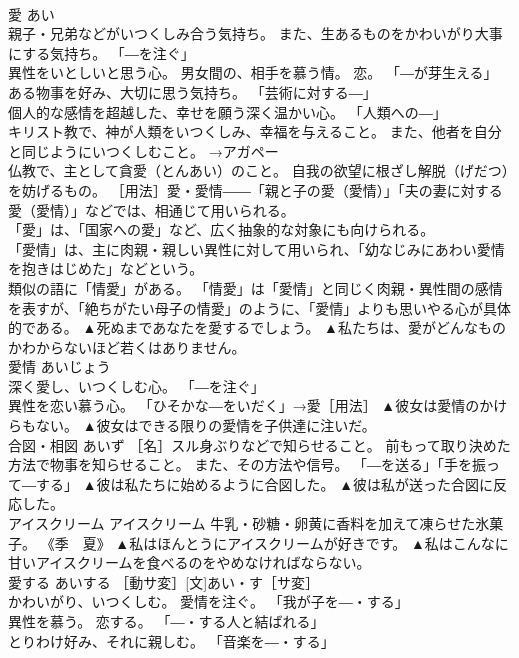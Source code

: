 \documentclass[8pt]{extreport}
\begin{document}
\begin{CJK}{UTF8}{min}
\\	愛	あい	
\\	親子・兄弟などがいつくしみ合う気持ち。 また、生あるものをかわいがり大事にする気持ち。 「―を注ぐ」 
\\	異性をいとしいと思う心。 男女間の、相手を慕う情。 恋。 「―が芽生える」 
\\	ある物事を好み、大切に思う気持ち。 「芸術に対する―」 
\\	個人的な感情を超越した、幸せを願う深く温かい心。 「人類への―」 
\\	キリスト教で、神が人類をいつくしみ、幸福を与えること。 また、他者を自分と同じようにいつくしむこと。 →アガペー 
\\	仏教で、主として貪愛（とんあい）のこと。 自我の欲望に根ざし解脱（げだつ）を妨げるもの。 ［用法］愛・愛情――「親と子の愛（愛情）」「夫の妻に対する愛（愛情）」などでは、相通じて用いられる。 
\\	「愛」は、「国家への愛」など、広く抽象的な対象にも向けられる。 
\\	「愛情」は、主に肉親・親しい異性に対して用いられ、「幼なじみにあわい愛情を抱きはじめた」などという。 
\\	類似の語に「情愛」がある。 「情愛」は「愛情」と同じく肉親・異性間の感情を表すが、「絶ちがたい母子の情愛」のように、「愛情」よりも思いやる心が具体的である。	▲死ぬまであなたを愛するでしょう。 ▲私たちは、愛がどんなものかわからないほど若くはありません。
\\	愛情	あいじょう	
\\	深く愛し、いつくしむ心。 「―を注ぐ」 
\\	異性を恋い慕う心。 「ひそかな―をいだく」→愛［用法］	▲彼女は愛情のかけらもない。 ▲彼女はできる限りの愛情を子供達に注いだ。
\\	合図・相図	あいず	［名］スル身ぶりなどで知らせること。 前もって取り決めた方法で物事を知らせること。 また、その方法や信号。 「―を送る」「手を振って―する」	▲彼は私たちに始めるように合図した。 ▲彼は私が送った合図に反応した。
\\	アイスクリーム	アイスクリーム	牛乳・砂糖・卵黄に香料を加えて凍らせた氷菓子。 《季　夏》	▲私はほんとうにアイスクリームが好きです。 ▲私はこんなに甘いアイスクリームを食べるのをやめなければならない。
\\	愛する	あいする	［動サ変］[文]あい・す［サ変］ 
\\	かわいがり、いつくしむ。 愛情を注ぐ。 「我が子を―・する」 
\\	異性を慕う。 恋する。 「―・する人と結ばれる」 
\\	とりわけ好み、それに親しむ。 「音楽を―・する」 

\end{CJK}
\end{document}
